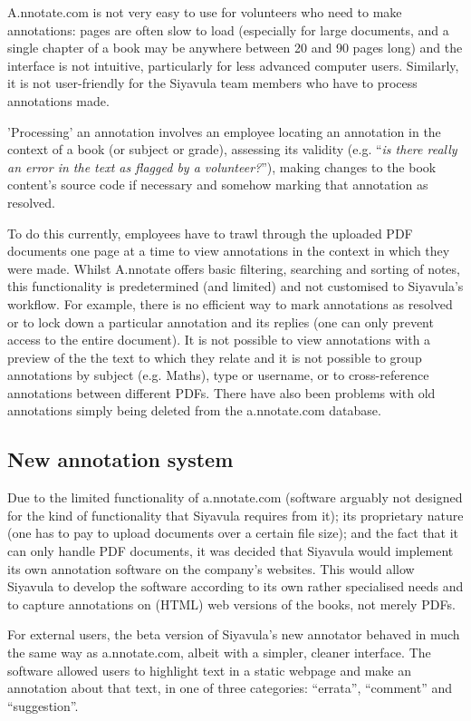 A.nnotate.com is not very easy to use for volunteers who need to make annotations: pages are often slow to load (especially for large documents, and a single chapter of a book may be anywhere between 20 and 90 pages long) and the interface is not intuitive, particularly for less advanced computer users. Similarly, it is not user-friendly for the Siyavula team members who have to process annotations made. 

'Processing' an annotation involves an employee locating an annotation in the context of a book (or subject or grade), assessing its validity (e.g. ``\textit{is there really an error in the text as flagged by a volunteer?}''), making changes to the book content's source code if necessary and somehow marking that annotation as resolved.

To do this currently, employees have to trawl through the uploaded PDF documents one page at a time to view annotations in the context in which they were made. Whilst A.nnotate offers basic filtering, searching and sorting of notes, this functionality is predetermined (and limited) and not customised to Siyavula's workflow. For example, there is no efficient way to mark annotations as resolved or to lock down a particular annotation and its replies (one can only prevent access to the entire document). It is not possible to view annotations with a preview of the the text to which they relate and it is not possible to group annotations by subject (e.g. Maths), type or username, or to cross-reference annotations between different PDFs. There have also been problems with old annotations simply being deleted from the a.nnotate.com database.  


\subsection{New annotation system}

Due to the limited functionality of a.nnotate.com (software arguably not designed for the kind of functionality that Siyavula requires from it); its proprietary nature (one has to pay to upload documents over a certain file size); and the fact that it can only handle PDF documents, it was decided that Siyavula would implement its own annotation software on the company's websites. This would allow Siyavula to develop the software according to its own rather specialised needs and to capture annotations on (HTML) web versions of the books, not merely PDFs.  

For external users, the beta version of Siyavula's new annotator behaved in much the same way as a.nnotate.com, albeit with a simpler, cleaner interface. The software allowed users to highlight text in a static webpage and make an annotation about that text, in one of three categories: ``errata'', ``comment'' and ``suggestion''. 

